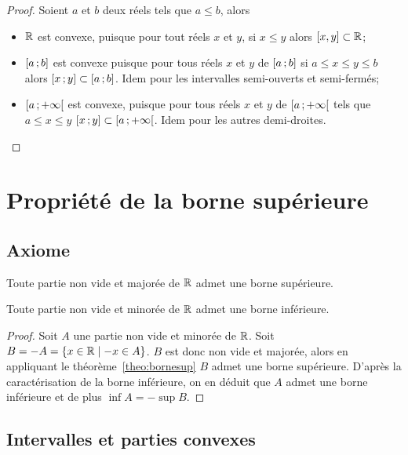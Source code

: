 \begin{proof}
  Soient $a$ et $b$ deux réels tels que $a\leqslant b$, alors
  \begin{itemize}
  \item $\mathbb{R}$ est convexe, puisque pour tout réels $x$ et $y$, si $x\leqslant y$ alors $[x,y]\subset \mathbb{R}$;
  \item $\left[ a \, ;  b \right]$ est convexe puisque pour tous réels $x$ et $y$ de $\left[ a \, ;  b \right]$ si $a\leqslant x\leqslant y\leqslant b$ alors $\left[ x \, ;  y \right]\subset \left[ a \, ;  b \right]$. Idem pour les intervalles semi-ouverts et semi-fermés;
  \item $\left[ a \, ;  +\infty \right[$ est convexe, puisque pour tous réels $x$ et $y$ de $\left[ a \, ;  +\infty \right[$ tels que $a\leqslant x\leqslant y$ $\left[ x \, ;  y \right]\subset \left[ a \, ;  +\infty \right[$. Idem pour les autres demi-droites.
  \end{itemize}
\end{proof}

\section{Propriété de la borne supérieure}

\subsection{Axiome}

\begin{theo}
  \label{theo:bornesup}
  Toute partie non vide et majorée de $\mathbb{R}$ admet une borne supérieure.
\end{theo}
\begin{theo}
  Toute partie non vide et minorée de $\mathbb{R}$ admet une borne inférieure.
\end{theo}
\begin{proof}
  Soit $A$ une partie non vide et minorée de $\mathbb{R}$. Soit $B=-A=\left\{x\in \mathbb{R}\mathrel{}\middle|\mathrel{}-x \in A\right\}$. $B$ est donc non vide et majorée, alors en appliquant le théorème~\ref{theo:bornesup} $B$ admet une borne supérieure. D'après la caractérisation de la borne inférieure, on en déduit que $A$ admet une borne inférieure et de plus $\inf A=-\sup B$.
\end{proof}

\subsection{Intervalles et parties convexes}

